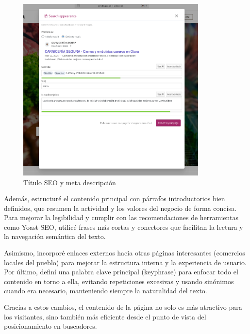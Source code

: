\documentclass[a4paper]{article}
\newcommand{\textgap}{\vspace{1em}}
\begin{document}
\begin{figure}[H]
    \centering
    \includegraphics[width=0.85\textwidth]{images/yoastl2.png}
    \caption{Título SEO y meta descripción}
\end{figure}

Además, estructuré el contenido principal con párrafos introductorios bien definidos, que resumen la actividad y los valores del negocio de forma concisa. Para mejorar la legibilidad y cumplir con las recomendaciones de herramientas como Yoast SEO, utilicé frases más cortas y conectores que facilitan la lectura y la navegación semántica del texto.

\textgap

Asimismo, incorporé enlaces externos hacia otras páginas interesantes (comercios locales del pueblo) para mejorar la estructura interna y la experiencia de usuario. Por último, definí una palabra clave principal (keyphrase) para enfocar todo el contenido en torno a ella, evitando repeticiones excesivas y usando sinónimos cuando era necesario, manteniendo siempre la naturalidad del texto.

\textgap

Gracias a estos cambios, el contenido de la página no solo es más atractivo para los visitantes, sino también más eficiente desde el punto de vista del posicionamiento en buscadores.
\end{document}
